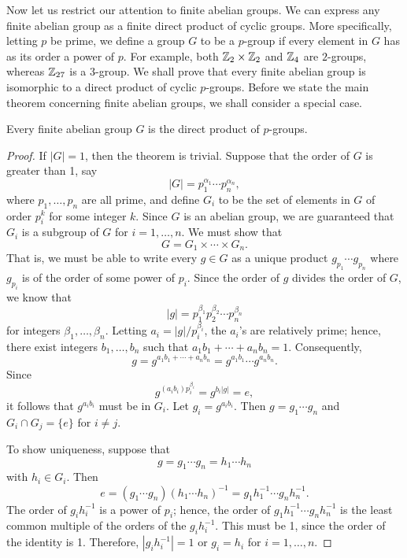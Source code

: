  
\vspace{2ex}
 
 
Now let us restrict our attention to finite abelian groups. We can
express any finite abelian group as a finite direct product of cyclic
groups. More specifically, letting $p$ be prime, we define a group $G$
to be a {\bfi $p$-group\/} if every element in 
$G$ has as its order a power of $p$. For example, both ${\Bbb Z}_2 
\times {\Bbb Z}_2$ and ${\Bbb Z}_4$ are $2$-groups, whereas 
${\Bbb Z}_{27}$ is a $3$-group. We shall prove that every finite 
abelian group is isomorphic to a direct product of cyclic $p$-groups. 
Before we  state the main theorem concerning finite abelian groups, we 
shall consider a special case.
 
 
\begin{theorem}
Every finite abelian group $G$ is the direct product of $p$-groups. 
\end{theorem}
 
 
\begin{proof}
If $|G|= 1$, then the theorem is trivial.  Suppose that the order of
$G$ is greater than 1, say 
\[
|G| = p_1^{\alpha_1} \cdots p_n^{\alpha_n},
\]
where $p_1, \ldots, p_n$ are all prime, and define $G_i$ to be the set
of elements in $G$ of order $p_i^k$ for some integer $k$. Since $G$ is
an abelian group, we are guaranteed that $G_i$ is a subgroup of $G$
for $i = 1, \ldots, n$. We must show that
\[
G = G_1 \times \cdots \times G_n.
\]
That is, we must be able to write every $g \in G$ as a unique product
$g_{p_1} \cdots g_{p_n}$ where $g_{p_i}$ is of the order of some power
of $p_i$. Since the order of $g$ divides the order of $G$, we know
that 
\[
|g| = p_1^{\beta_1}  p_2^{\beta_2} \cdots p_n^{\beta_n}
\]
for integers $\beta_1, \ldots, \beta_n$. Letting $a_i = |g| /
p_i^{\beta_i}$, the $a_i$'s are relatively prime; hence, there exist
integers $b_1, \ldots, b_n$ such that $a_1 b_1 + \cdots + a_n b_n =
1$. Consequently, 
\[
g = g^{a_1 b_1 + \cdots + a_n b_n} = g^{a_1 b_1} \cdots  g^{a_n b_n}. 
\]
Since
\[
g^{(a_i b_i ) p_i^{\beta_i}} = g^{b_i |g|} = e,
\]
it follows that $g^{a_i b_i}$ must be in $G_{i}$. Let $g_i =
g^{a_i b_i}$. Then $g = g_1 \cdots g_n$ and $G_i \cap G_j = \{ e \}$ for $i
\neq j$. 
 
 
To show uniqueness, suppose that 
\[
g = g_1 \cdots g_n = h_1 \cdots h_n
\]
with $h_i \in G_i$. Then
\[
e = (g_1 \cdots g_n)(h_1 \cdots h_n)^{-1} = g_1 h_1^{-1} \cdots g_n
h_n^{-1}. 
\]
The order of $g_i h_i^{-1}$ is a power of $p_i$; hence, the order of
$g_1 h_1^{-1} \cdots g_n h_n^{-1}$ is the least common multiple of the
orders of the $g_i h_i^{-1}$.  This must be 1, since the order of the
identity is 1. Therefore, $|g_i h_i^{-1}| =1$ or $g_i =h_i$ for $i =
1, \ldots, n$.
\mbox{\hspace{1in}}
\end{proof}
 
